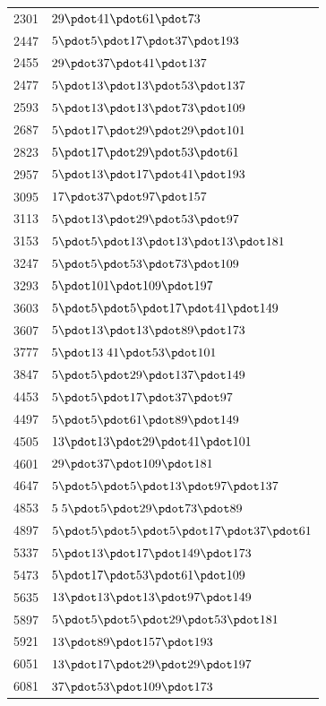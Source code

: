 \begin{longtable}{@{}r|l@{}}
2301 & $29\pdot 41\pdot 61\pdot 73$\\
2447 & $5\pdot 5\pdot 17\pdot 37\pdot 193$\\
2455 & $29\pdot 37\pdot 41\pdot 137$\\
2477 & $5\pdot 13\pdot 13\pdot 53\pdot 137$\\
2593 & $5\pdot 13\pdot 13\pdot 73\pdot 109$\\
2687 & $5\pdot 17\pdot 29\pdot 29\pdot 101$\\
2823 & $5\pdot 17\pdot 29\pdot 53\pdot 61$\\
2957 & $5\pdot 13\pdot 17\pdot 41\pdot 193$\\
3095 & $17\pdot 37\pdot 97\pdot 157$\\
3113 & $5\pdot 13\pdot 29\pdot 53\pdot 97$\\
3153 & $5\pdot 5\pdot 13\pdot 13\pdot 13\pdot 181$\\
3247 & $5\pdot 5\pdot 53\pdot 73\pdot 109$\\
3293 & $5\pdot 101\pdot 109\pdot 197$\\
3603 & $5\pdot 5\pdot 5\pdot 17\pdot 41\pdot 149$\\
3607 & $5\pdot 13\pdot 13\pdot 89\pdot 173$\\
3777 & $5\pdot 13\;41\pdot 53\pdot 101$\\
3847 & $5\pdot 5\pdot 29\pdot 137\pdot 149$\\
4453 & $5\pdot 5\pdot 17\pdot 37\pdot 97$\\
4497 & $5\pdot 5\pdot 61\pdot 89\pdot 149$\\
4505 & $13\pdot 13\pdot 29\pdot 41\pdot 101$\\
4601 & $29\pdot 37\pdot 109\pdot 181$\\
4647 & $5\pdot 5\pdot 5\pdot 13\pdot 97\pdot 137$\\
4853 & $5\;5\pdot 5\pdot 29\pdot 73\pdot 89$\\
4897 & $5\pdot 5\pdot 5\pdot 5\pdot 17\pdot 37\pdot 61$\\
5337 & $5\pdot 13\pdot 17\pdot 149\pdot 173$\\
5473 & $5\pdot 17\pdot 53\pdot 61\pdot 109$\\
5635 & $13\pdot 13\pdot 13\pdot 97\pdot 149$\\
5897 & $5\pdot 5\pdot 5\pdot 29\pdot 53\pdot 181$\\
5921 & $13\pdot 89\pdot 157\pdot 193$\\
6051 & $13\pdot 17\pdot 29\pdot 29\pdot 197$\\
6081 & $37\pdot 53\pdot 109\pdot 173$\\

\end{longtable}
